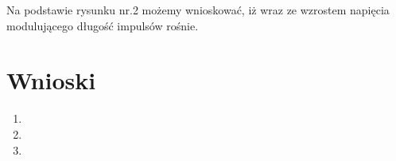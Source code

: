 \documentclass[a4paper,12pt]{article}
\begin{document}
Na podstawie rysunku nr.2 możemy wnioskować, iż wraz ze wzrostem napięcia modulującego długość impulsów rośnie.
\pagebreak
\section {Wnioski}
\begin{enumerate}  
\item 
\item
\item 
\end{enumerate}
\end{document}

